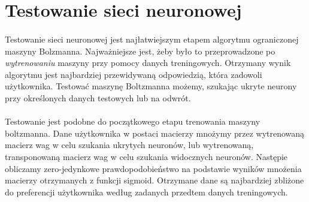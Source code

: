\section{Testowanie sieci neuronowej}
    \paragraph{}
	Testowanie sieci neuronowej jest najłatwiejszym etapem algorytmu ograniczonej maszyny Bolzmanna. Najważniejsze jest, żeby było to przeprowadzone po
    \textit{wytrenowaniu} maszyny przy pomocy danych treningowych. Otrzymany wynik algorytmu jest najbardziej przewidywaną odpowiedzią, która zadowoli
    użytkownika. Testować maszynę Boltzmanna możemy, szukając ukryte neurony przy określonych danych testowych lub na odwrót.
    \paragraph{}
	Testowanie jest podobne do początkowego etapu trenowania maszyny boltzmanna. Dane użytkownika w postaci macierzy mnożymy przez wytrenowaną
    macierz wag w celu szukania ukrytych neuronów, lub wytrenowaną, transponowaną macierz wag w celu szukania widocznych neuronów. Następie obliczamy
    zero-jedynkowe prawdopodobieństwo na podstawie wyników mnożenia macierzy otrzymanych z funkcji sigmoid. Otrzymane dane są najbardziej zbliżone do
    preferencji użytkownika według zadanych przedtem danych treningowych.